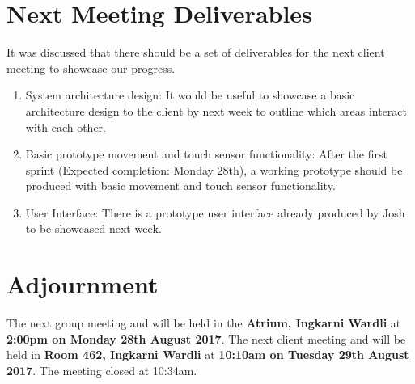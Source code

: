 \documentclass{article}
\begin{document}
\section{Next Meeting Deliverables}
It was discussed that there should be a set of deliverables for the next client meeting to showcase our progress.
\begin{enumerate}
\item System architecture design: It would be useful to showcase a basic architecture design to the client by next week to outline which areas interact with each other.
\item Basic prototype movement and touch sensor functionality: After the first sprint (Expected completion: Monday 28th), a working prototype should be produced with basic movement and touch sensor functionality.
\item User Interface:
There is a prototype user interface already produced by Josh to be showcased next week.
\end{enumerate}
\section{Adjournment}
    The next group meeting and will be held in the {\bf Atrium, Ingkarni Wardli} at {\bf 2:00pm on Monday 28th August 2017}.\newline
    The next client meeting and will be held in {\bf Room 462, Ingkarni Wardli} at {\bf 10:10am on Tuesday 29th August 2017}.\newline
The meeting closed at 10:34am.
\end{document}
